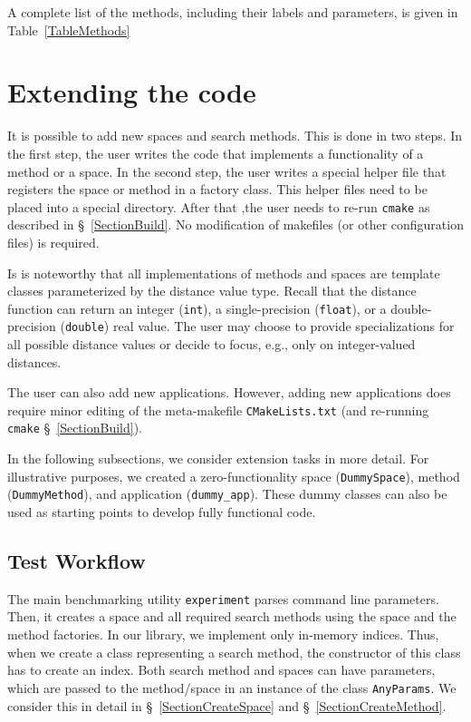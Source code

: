 \documentclass[runningheads,a4paper]{llncs}
\newcommand{\ttt}[1]{\texttt{#1}}
\begin{document}
A complete list of the methods, including their labels and parameters, is given in Table~\ref{TableMethods}

\section{Extending the code}\label{SectionExtend}
It is possible to add new spaces and search methods.
This is done in two steps. 
In the first step, the user writes the code that implements a
functionality of a method or a space.
In the second step, the user writes a special helper file  
that registers the space or method in a factory class.
This helper files need to be placed into a special directory.
After that ,the user needs to re-run \ttt{cmake} as described in \S~\ref{SectionBuild}.
No modification of makefiles (or other configuration files) is required.

Is is noteworthy that all implementations of methods and spaces
are template classes parameterized by the distance value type.
Recall that the distance function can return an integer (\ttt{int}), 
a single-precision (\ttt{float}), or a double-precision (\ttt{double}) real value.
The user may choose to provide specializations for all possible
distance values or decide to focus, e.g., only on integer-valued distances.

The user can also add new applications.
However, adding new applications does require minor editing of the meta-makefile \ttt{CMakeLists.txt} 
(and re-running \ttt{cmake} \S~\ref{SectionBuild}).

In the following subsections, 
we consider extension tasks in more detail.
For illustrative purposes,
we created a zero-functionality space (\texttt{DummySpace}), 
method (\texttt{DummyMethod}), and application (\texttt{dummy\_app}).
These dummy classes can also be used as starting points to develop fully functional code.

\subsection{Test Workflow}\label{SectionWorkflow}
The main benchmarking utility \ttt{experiment} parses command line parameters. 
Then, it creates a space and all required search methods using
the space and the method factories.
In our library, we implement only in-memory indices.
Thus, when we create a class representing a search method,
the constructor of this class has to create an index.
Both search method and spaces can have parameters,
which are passed to the method/space in an instance
of the class \ttt{AnyParams}.
We consider this in detail in \S~\ref{SectionCreateSpace} and \S~\ref{SectionCreateMethod}.
\end{document}
